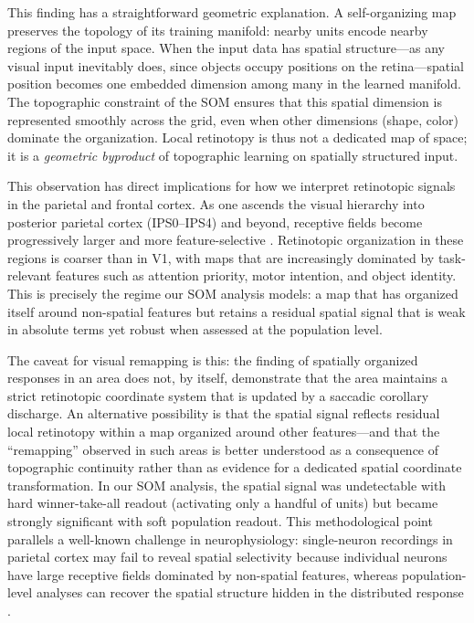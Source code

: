 This finding has a straightforward geometric explanation. A self-organizing map
preserves the topology of its training manifold: nearby units encode nearby regions
of the input space. When the input data has spatial structure---as any visual input
inevitably does, since objects occupy positions on the retina---spatial position
becomes one embedded dimension among many in the learned manifold. The topographic
constraint of the SOM ensures that this spatial dimension is represented smoothly
across the grid, even when other dimensions (shape, color) dominate the
organization. Local retinotopy is thus not a dedicated map of space; it is a
\emph{geometric byproduct} of topographic learning on spatially structured input.

This observation has direct implications for how we interpret retinotopic signals
in the parietal and frontal cortex. As one ascends the visual hierarchy into
posterior parietal cortex (IPS0--IPS4) and beyond, receptive fields become
progressively larger and more feature-selective
\citep{swisher2007, arcaro2020}. Retinotopic organization
in these regions is coarser than in V1, with maps that are increasingly dominated by
task-relevant features such as attention priority, motor intention, and object
identity. This is precisely the regime our SOM analysis models: a map that has
organized itself around non-spatial features but retains a residual spatial signal
that is weak in absolute terms yet robust when assessed at the population level.

The caveat for visual remapping is this: the finding of spatially organized
responses in an area does not, by itself, demonstrate that the area maintains a
strict retinotopic coordinate system that is updated by a saccadic corollary
discharge. An alternative possibility is that the spatial signal reflects residual
local retinotopy within a map organized around other features---and that the
``remapping'' observed in such areas is better understood as a consequence of
topographic continuity rather than as evidence for a dedicated spatial coordinate
transformation. In our SOM analysis, the spatial signal was undetectable with
hard winner-take-all readout (activating only a handful of units) but became
strongly significant with soft population readout. This methodological point
parallels a well-known challenge in neurophysiology: single-neuron recordings in
parietal cortex may fail to reveal spatial selectivity because individual neurons
have large receptive fields dominated by non-spatial features, whereas
population-level analyses can recover the spatial structure hidden in the
distributed response \citep{sereno2001}.

